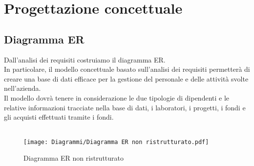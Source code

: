 \chapter{Progettazione concettuale}
    \section{Diagramma ER}
        Dall'analisi dei requisiti costruiamo il diagramma ER.\\
        In particolare, il modello concettuale basato sull'analisi dei requisiti permetterà di creare una base di dati efficace per la gestione del personale e delle attività svolte nell'azienda.\\
        Il modello dovrà tenere in considerazione le due tipologie di dipendenti e le relative informazioni tracciate nella base di dati, i laboratori, i progetti, i fondi e gli acquisti effettuati tramite i fondi.\\\\
        \begin{figure}[htbp!]
            \centering
                \vspace{4\baselineskip}
                \texttt{[image: Diagrammi/Diagramma ER non ristrutturato.pdf]}
            \caption{Diagramma ER non ristrutturato}
            \label{fig:Diagramma ER non ristrutturato}
        \end{figure}